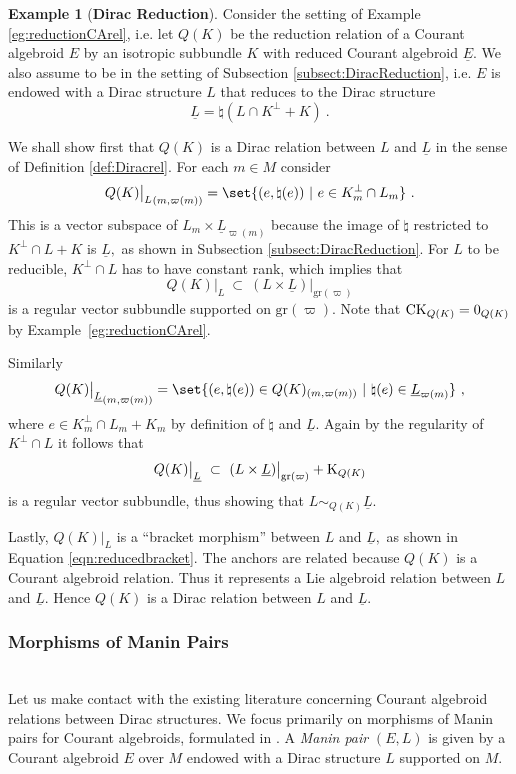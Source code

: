 \documentclass[a4paper, reqno, 11pt]{amsart}
\numberwithin{equation}{section}
\theoremstyle{definition}
\newtheorem{example}[equation]{Example}
\newcommand{\red}[1]{\underline{#1}}
\newcommand{\gr}{\text{gr}}
\theoremstyle{remark}
\begin{document}
\begin{example}[\textbf{Dirac Reduction}] \label{eg:Diracreductionrel}
Consider the setting of Example \ref{eg:reductionCArel}, i.e. let $Q(K)$ be the reduction relation of a Courant algebroid $E$ by an isotropic subbundle $K$ with reduced Courant algebroid $\red E$. We also assume to be in the setting of Subsection \ref{subsect:DiracReduction}, i.e. $E$ is endowed with a Dirac structure $L$ that reduces to the Dirac structure $$\red L = \natural(L \cap K^\perp + K) \ . $$ 

We shall show first that $Q(K)$ is a Dirac relation between $L$ and $\red L$ in the sense of Definition \ref{def:Diracrel}. For each $m\in M$ consider
\begin{align}
    {Q(K) \big\rvert_L}_{(m, \varpi(m))} = \set{(e , \natural(e)) \ \vert \ e \in K^\perp_m \cap L_m} \ .
\end{align}
This is a vector subspace of $L_m \times {\red L}_{\varpi(m)} $ because the image of $\natural$ restricted to $K^\perp \cap L + K$ is $\red L,$ as shown in Subsection \ref{subsect:DiracReduction}. For $L$ to be reducible, $ K^\perp\cap L$ has to have constant rank, which implies that $$Q(K) \big\rvert_L \ \subset \ (L \times {\red L}) \big\rvert_{\gr(\varpi)}$$ is a regular vector subbundle supported on $\gr(\varpi).$ Note that $ {\rm CK}_{Q(K)} = 0_{Q(K)}$ by Example~\ref{eg:reductionCArel}.

Similarly
\begin{align}
    {Q(K) \big\rvert_{\red L}}_{(m, \varpi(m))}= \set{(e, \natural(e)) \in Q(K)_{(m, \varpi(m))} \ \vert \ \natural(e) \in {\red L}_{\varpi(m)} } \ ,
\end{align}
where $e \in K^\perp_m \cap L_m + K_m$ by definition of $\natural$ and $\red L$. Again by the regularity of $K^\perp \cap L$ it follows that $$Q(K)\big|_{\red L} \ \subset \ (L \times \red L)\big\rvert_{\gr(\varpi)}+ {\rm K}_{Q(K)}$$ is a regular vector subbundle, thus showing that $L \sim_{Q(K)} \red L$.

Lastly, $Q(K) \rvert_L$ is a ``bracket morphism'' between $L$ and $\red L,$ as shown in Equation \eqref{eqn:reducedbracket}. The anchors are related because $Q(K)$ is a Courant algebroid relation. Thus it represents a Lie algebroid relation between $L$ and $\red L.$ Hence $Q(K)$ is a Dirac relation between $L$ and $\red L.$ 
\end{example}

\medskip

\subsubsection{Morphisms of Manin Pairs}~\\[5pt]
Let us make contact with the existing literature concerning Courant algebroid relations between Dirac structures. We focus primarily on morphisms of Manin pairs for Courant algebroids, formulated in \cite{bursztyn2008courant}.
A \emph{Manin pair}  $(E, L)$ is given by a Courant algebroid $E$ over $M$ endowed with a Dirac structure $L$ supported on $M.$
\end{document}
